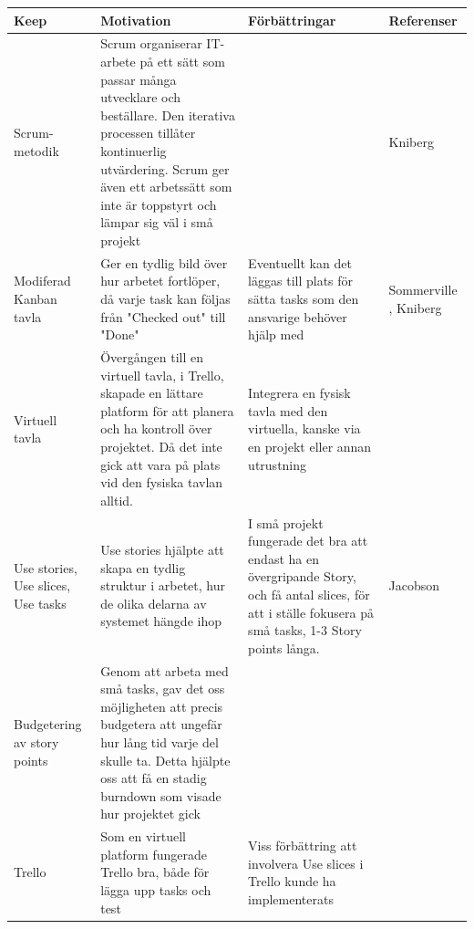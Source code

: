 \documentclass[conference,a4paper]{IEEEtran}
\newcommand\Tstrut{\rule{0pt}{2.6ex}}       %
\newcommand\Bstrut{\rule[-0.9ex]{0pt}{0pt}} %
\newcommand{\TBstrut}{\Tstrut\Bstrut} %
\begin{document}
\begin{table}[H]
	\small
  \centering
	\begin{tabular}{|p{1.5cm}|p{2.3cm}|p{1.5cm}|p{1.5cm}|} %
    \hline
    Keep & Motivation & Förbättringar & Referenser \TBstrut \\
    \hline
    Scrum-metodik  & Scrum organiserar IT-arbete på ett sätt som passar många utvecklare och beställare. Den iterativa processen tillåter kontinuerlig utvärdering. Scrum ger även ett arbetssätt som inte är toppstyrt och lämpar sig väl i små projekt  & & Kniberg \cite{Kniberg07} \TBstrut \\
    \hline
    Modiferad Kanban tavla & Ger en tydlig bild över hur arbetet fortlöper, då varje task kan följas från "Checked out" till "Done" & Eventuellt kan det läggas till plats för sätta tasks som den ansvarige behöver hjälp med & Sommerville \cite{Sommerville10}, Kniberg \cite{Kniberg10} \TBstrut \\
    \hline
    Virtuell tavla & Övergången till en virtuell tavla, i Trello, skapade en lättare platform för att planera och ha kontroll över projektet. Då det inte gick att vara på plats vid den fysiska tavlan alltid. & Integrera en fysisk tavla med den virtuella, kanske via en projekt eller annan utrustning & \TBstrut \\
    \hline
    Use stories, Use slices, Use tasks & Use stories hjälpte att skapa en tydlig struktur i arbetet, hur de olika delarna av systemet hängde ihop  & I små projekt fungerade det bra att endast ha en övergripande Story, och få antal slices, för att i ställe fokusera på små tasks, 1-3 Story points långa. & Jacobson \cite{Jacobson11} \TBstrut \\
    \hline
    Budgetering av story points & Genom att arbeta med små tasks, gav det oss möjligheten att precis budgetera att ungefär hur lång tid varje del skulle ta. Detta hjälpte oss att få en stadig burndown som visade hur projektet gick&  & \TBstrut \\
    \hline
    Trello & Som en virtuell platform fungerade Trello bra, både för lägga upp tasks och test& Viss förbättring att involvera Use slices i Trello kunde ha implementerats  & \TBstrut \\
    \hline
  \end{tabular}
\end{table}
\end{document}

